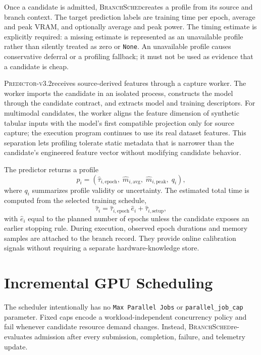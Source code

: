 \documentclass{article}
\newcommand{\method}{\textsc{BranchSched}}
\newcommand{\predictor}{\textsc{Predictor-v3.2}}
\begin{document}
Once a candidate is admitted, \method creates a profile from its source and branch context. The target prediction labels are training time per epoch, average and peak VRAM, and optionally average and peak power. The timing estimate is explicitly required: a missing estimate is represented as an unavailable profile rather than silently treated as zero or \texttt{None}. An unavailable profile causes conservative deferral or a profiling fallback; it must not be used as evidence that a candidate is cheap.

\predictor receives source-derived features through a capture worker. The worker imports the candidate in an isolated process, constructs the model through the candidate contract, and extracts model and training descriptors. For multimodal candidates, the worker aligns the feature dimension of synthetic tabular inputs with the model's first compatible projection only for source capture; the execution program continues to use its real dataset features. This separation lets profiling tolerate static metadata that is narrower than the candidate's engineered feature vector without modifying candidate behavior.

The predictor returns a profile
\begin{equation}
  p_i = (\hat{\tau}_{i,\mathrm{epoch}},\; \hat{m}_{i,\mathrm{avg}},\;
  \hat{m}_{i,\mathrm{peak}},\; q_i),
  \label{eq:profile}
\end{equation}
where $q_i$ summarizes profile validity or uncertainty. The estimated total time is computed from the selected training schedule,
\begin{equation}
  \hat{\tau}_i = \hat{\tau}_{i,\mathrm{epoch}}\,\hat{e}_i + \hat{\tau}_{i,\mathrm{setup}},
\end{equation}
with $\hat{e}_i$ equal to the planned number of epochs unless the candidate exposes an earlier stopping rule. During execution, observed epoch durations and memory samples are attached to the branch record. They provide online calibration signals without requiring a separate hardware-knowledge store.

\section{Incremental GPU Scheduling}
\label{sec:scheduling}

The scheduler intentionally has no \texttt{Max Parallel Jobs} or \texttt{parallel\_job\_cap} parameter. Fixed caps encode a workload-independent concurrency policy and fail whenever candidate resource demand changes. Instead, \method re-evaluates admission after every submission, completion, failure, and telemetry update.
\end{document}
